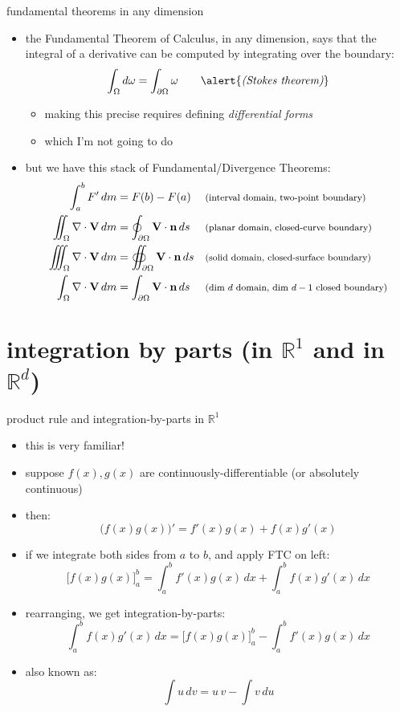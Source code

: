 \documentclass[10pt,
               svgnames,
               hyperref={colorlinks,
                         citecolor=DeepPink4,
                         linkcolor=FireBrick,
                         urlcolor=blue},
               usepdftitle=false]{beamer}
\newcommand{\bn}{\mathbf{n}}
\newcommand{\bV}{\mathbf{V}}
\newcommand{\RR}{\mathbb{R}}
\newcommand{\Div}{\nabla\cdot}
\begin{document}
\begin{frame}{fundamental theorems in any dimension}

\begin{itemize}
\item the Fundamental Theorem of Calculus, in any dimension, says that the integral of a derivative can be computed by integrating over the boundary:
    $$\int_\Omega d\omega = \int_{\partial\Omega} \omega \qquad \text{\alert{\emph{(Stokes theorem)}}}$$

    \begin{itemize}
    \item[$\circ$] making this precise requires defining \emph{differential forms}
    \item[$\circ$] which I'm not going to do
    \end{itemize}
\item but we have this stack of Fundamental/Divergence Theorems:
\begin{align*}
\int_a^b F'\,dm &= F(b)-F(a) &&\text{\footnotesize (interval domain, two-point boundary)} \\
\iint_\Omega \Div \bV\,dm &= \oint_{\partial\Omega} \bV\cdot \bn\,ds &&\text{\footnotesize (planar domain, closed-curve boundary)} \\
\iiint_\Omega \Div \bV\,dm &= \oiint_{\partial\Omega} \bV\cdot \bn\,ds &&\text{\footnotesize (solid domain, closed-surface boundary)} \\
\int_\Omega \Div \bV\,dm &= \int_{\partial\Omega} \bV\cdot \bn\,ds &&\text{\footnotesize (dim $d$ domain, dim $d-1$ closed boundary)}
\end{align*}
\end{itemize}
\end{frame}


\section{integration by parts (in $\RR^1$ and in $\RR^d$)}


\begin{frame}{product rule and integration-by-parts in $\RR^1$}

\begin{itemize}
\item this is very familiar!
\item suppose $f(x),g(x)$ are continuously-differentiable {\small (or absolutely continuous)}
\item then:
	$$\Big(f(x) g(x)\Big)' = f'(x) g(x) + f(x) g'(x)$$
\item if we integrate both sides from $a$ to $b$, and apply FTC on left:
	$$\Big[f(x) g(x)\Big]_a^b = \int_a^b f'(x) g(x)\,dx + \int_a^b f(x) g'(x)\,dx$$
\item rearranging, we get integration-by-parts:
	$$\boxed{\int_a^b f(x) g'(x)\,dx = \Big[f(x) g(x)\Big]_a^b - \int_a^b f'(x) g(x)\,dx}$$
\item also known as:
	$$\int u\,dv = u\,v - \int v\,du$$
\end{itemize}
\end{frame}
\end{document}
